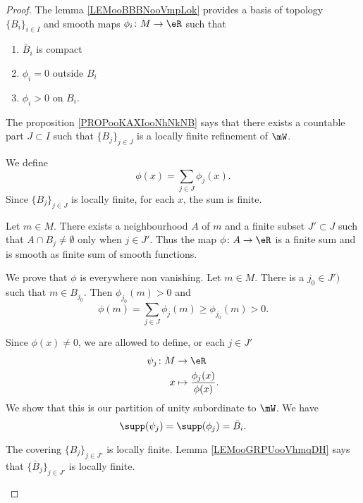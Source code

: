 \begin{proof}
	The lemma \ref{LEMooBBBNooVmpLok} provides a basis of topology \( \{ B_i \}_{i\in I}\) and smooth maps \(\phi_i \colon M\to \eR  \) such that
	\begin{enumerate}
		\item
		      \( \bar B_i\) is compact
		\item
		      \( \phi_i=0\) outside \( B_i\)
		\item
		      \( \phi_i>0\) on \( B_i\).
	\end{enumerate}
	The proposition \ref{PROPooKAXIooNhNkNB} says that there exists a countable part \( J\subset I\) such that \( \{ B_j \}_{j\in J}\) is a locally finite refinement of \( \mW\).

	\begin{subproof}

		We define
		\begin{equation}
			\phi(x)=\sum_{j\in J}\phi_j(x).
		\end{equation}
		Since \( \{ B_j \}_{j\in J}\) is locally finite, for each \( x\), the sum is finite.

		Let \( m\in M\). There exists a neighbourhood \( A\) of \( m\) and a finite subset \( J'\subset J\) such that \( A\cap B_j\neq \emptyset\) only when \( j\in J'\). Thus the map \(\phi \colon A\to \eR  \) is a finite sum and is smooth as finite sum of smooth functions.

		We prove that \( \phi\) is everywhere non vanishing. Let \( m\in M\). There is a \( j_0\in J') \) such that \( m\in B_{j_0}\). Then \( \phi_{j_0}(m)>0\) and
		\begin{equation}
			\phi(m)=\sum_{j\in J}\phi_j(m)\geq \phi_{j_0}(m)>0.
		\end{equation}

		Since \( \phi(x)\neq 0\), we are allowed to define, or each \( j\in J'\)
		\begin{equation}
			\begin{aligned}
				\psi_j\colon   M & \to \eR                                \\
				x                & \mapsto \frac{ \phi_j(x) }{ \phi(x) }.
			\end{aligned}
		\end{equation}
		We show that this is our partition of unity subordinate to \( \mW\). We have
		\begin{equation}		\label{EQooVRCOooKnBAmA}
			\supp(\psi_j)=\supp(\phi_j)=\bar B_i.
		\end{equation}
		\begin{subproof}
			The covering \( \{ B_j \}_{j\in J'}\) is locally finite. Lemma \ref{LEMooGRPUooVhmqDH} says that \( \{ \bar B_j \}_{j\in J'}\) is locally finite.


\end{subproof}
\end{subproof}
\end{proof}
